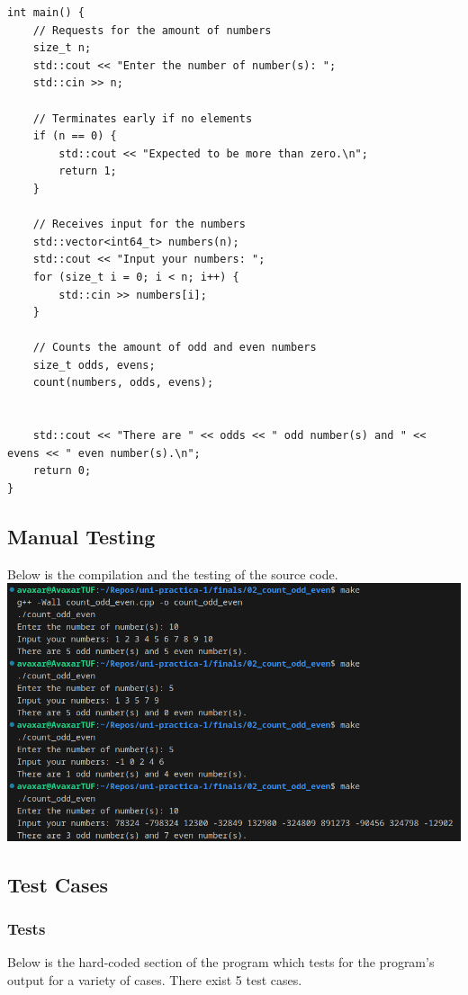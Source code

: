 \documentclass[12pt]{article}
\begin{document}
\begin{verbatim}
int main() {
    // Requests for the amount of numbers
    size_t n;
    std::cout << "Enter the number of number(s): ";
    std::cin >> n;

    // Terminates early if no elements
    if (n == 0) {
        std::cout << "Expected to be more than zero.\n";
        return 1;
    }

    // Receives input for the numbers
    std::vector<int64_t> numbers(n);
    std::cout << "Input your numbers: ";
    for (size_t i = 0; i < n; i++) {
        std::cin >> numbers[i];
    }

    // Counts the amount of odd and even numbers
    size_t odds, evens;
    count(numbers, odds, evens);


    std::cout << "There are " << odds << " odd number(s) and " << evens << " even number(s).\n";
    return 0;
}
\end{verbatim}

\subsection{Manual Testing}
Below is the compilation and the testing of the source code.
\newline\includegraphics[width=\textwidth]{02_count_odd_even}

\subsection{Test Cases}

\subsubsection{Tests}

Below is the hard-coded section of the program which tests for the program's output for a variety of cases. There exist 5 test cases.
\end{document}

